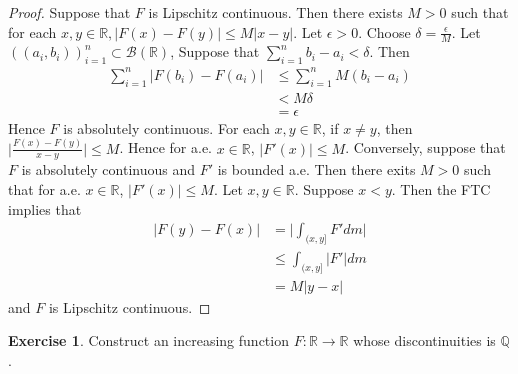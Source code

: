 \documentclass[12pt]{amsart}
\theoremstyle{definition}
\newtheorem{ex}[definition]{Exercise}
\newcommand{\del}{\delta}
\newcommand{\ep}{\epsilon}
\newcommand{\R}{\mathbb{R}}
\newcommand{\Q}{\mathbb{Q}}
\newcommand{\MB}{\mathcal{B}}
\begin{document}
	\begin{proof}
		Suppose that $F$ is Lipschitz continuous. Then there exists $M>0$ such that for each $x,y \in \R, |F(x)-F(y)| \leq M|x-y|$. Let $\ep >0$. Choose $\del = \frac{\ep}{M}$. Let $((a_i, b_i))_{i=1}^n \subset \MB(\R)$, Suppose that $\sum_{i=1}^n b_i-a_i < \del$. Then 
		\begin{align*}
			\sum_{i=1}^n|F(b_i)-F(a_i)| 
			&\leq \sum_{i=1}^n M(b_i - a_i)\\
			&< M\del\\
			&= \ep
		\end{align*}
		Hence $F$ is absolutely continuous. For each $x, y \in \R$, if $x \neq y$, then $\bigg|\frac{F(x)-F(y)}{x-y}\bigg| \leq M$. Hence for a.e. $x \in \R$, $|F'(x)| \leq M$. Conversely, suppose that $F$ is absolutely continuous and $F'$ is bounded a.e. Then there exits $M> 0$ such that for a.e. $x \in \R$, $|F'(x)| \leq M$. Let $x,y \in \R$. Suppose $x<y$. Then the FTC implies that 
		\begin{align*}
			|F(y)-F(x)|
			& = \bigg|\int_{(x,y]}F'dm\bigg|\\
			&\leq \int_{(x,y]}|F'|dm\\
			&=M|y-x|
		\end{align*}
		and $F$ is Lipschitz continuous.
	\end{proof}
	
	\begin{ex}
		Construct an increasing function $F: \R \rightarrow \R$ whose discontinuities is $\Q$.
	\end{ex}
	
\end{document}
